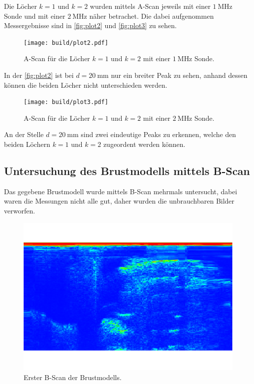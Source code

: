 Die Löcher $k = 1$ und $k = 2$ wurden mittels A-Scan jeweils mit einer $\SI{1}{\mega\hertz}$ Sonde und mit einer
$\SI{2}{\mega\hertz}$ näher betrachet. Die dabei aufgenommen Messergebnisse sind in \autoref{fig:plot2} und \autoref{fig:plot3}
zu sehen.

\begin{figure}[H]
	\texttt{[image: build/plot2.pdf]}
	\captionsetup{width=0.765\linewidth}
	\caption{A-Scan für die Löcher $k = 1$ und $k = 2$ mit einer $\SI{1}{\mega\hertz}$ Sonde.}
	\label{fig:plot2}
\end{figure}
In der \autoref{fig:plot2} ist bei $d = \SI{20}{\milli\meter}$ nur ein breiter Peak zu sehen, anhand dessen können die beiden Löcher nicht unterschieden werden.

\begin{figure}[H]
	\texttt{[image: build/plot3.pdf]}
	\captionsetup{width=0.765\linewidth}
	\caption{A-Scan für die Löcher $k = 1$ und $k = 2$ mit einer $\SI{2}{\mega\hertz}$ Sonde.}
	\label{fig:plot3}
\end{figure}
An der Stelle $d = \SI{20}{\milli\meter}$ sind zwei eindeutige Peaks zu erkennen, welche den beiden Löchern $k = 1$ und $k = 2$
zugeordent werden können.

\subsection{Untersuchung des Brustmodells mittels B-Scan}
\label{sec:Untersuchung des Brustmodells mittels B-Scan}

Das gegebene Brustmodell wurde mittels B-Scan mehrmals untersucht, dabei waren die Messungen nicht alle gut, daher wurden 
die unbrauchbaren Bilder verworfen.

\begin{figure}[H]
    \centering
	\includegraphics[width=0.8\linewidth]{content/grafik/Tumor_2.pdf}
    \captionsetup{width=0.765\linewidth}
	\caption{Erster B-Scan der Brustmodells.}
	\label{fig:b1}
\end{figure}

